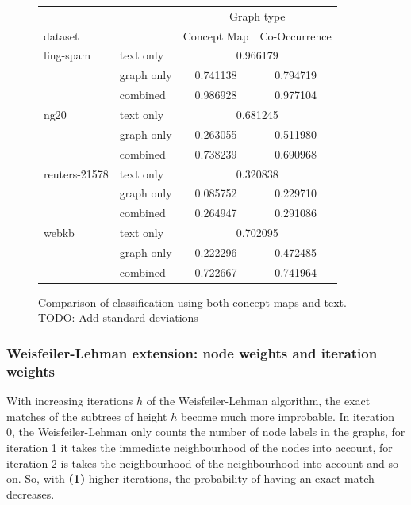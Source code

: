 \begin{figure}[ht]
\centering
\begin{tabular}{llcc}
  &  & \multicolumn{2}{c}{Graph type} \\
   dataset   & &  Concept Map &  Co-Occurrence \\
\midrule
ling-spam 
          & text only & \multicolumn{2}{c}{ 0.966179 }\\
          & graph only &  0.741138 &  0.794719\\
          & combined &  0.986928 &  0.977104\\
\midrule
ng20 
          & text only & \multicolumn{2}{c}{ 0.681245 }\\
          & graph only &  0.263055 &  0.511980\\
          & combined &  0.738239 &  0.690968\\
\midrule
reuters-21578 
          & text only & \multicolumn{2}{c}{ 0.320838 }\\
          & graph only &  0.085752 &  0.229710\\
          & combined &  0.264947 &  0.291086\\
\midrule
webkb 
          & text only & \multicolumn{2}{c}{ 0.702095 }\\
          & graph only &  0.222296 &  0.472485\\
          & combined &  0.722667 &  0.741964\\
\bottomrule
\end{tabular}
\caption{Comparison of classification using both concept maps and text. TODO: Add standard deviations}%
\label{fig:results_comparison_combined}
\end{figure}



\subsubsection{Weisfeiler-Lehman extension: node weights and iteration weights}
With increasing iterations $h$ of the Weisfeiler-Lehman algorithm, the exact matches of the subtrees of height $h$ become much more improbable.
In iteration 0, the Weisfeiler-Lehman only counts the number of node labels in the graphs, for iteration 1 it takes the immediate neighbourhood of the nodes into account, for iteration 2 is takes the neighbourhood of the neighbourhood into account and so on.
So, with \textbf{(1)} higher iterations, the probability of having an exact match decreases.


